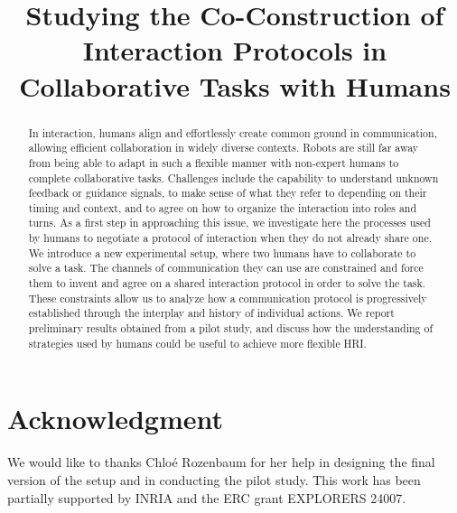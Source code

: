 \documentclass[conference]{IEEEtran}
\begin{document}
\title{Studying the Co-Construction of Interaction Protocols in Collaborative Tasks with Humans}

\author{
}

\maketitle

\begin{abstract}
In interaction, humans align and effortlessly create common ground in communication, allowing efficient collaboration in widely diverse contexts.
Robots are still far away from being able to adapt in such a flexible manner with non-expert humans to complete collaborative tasks. Challenges include the capability to understand unknown feedback or guidance signals, to make sense of what they refer to depending on their timing and context, and to agree on how to organize the interaction into roles and turns. 
As a first step in approaching this issue, we investigate here the processes used by humans to negotiate a protocol of interaction when they do not already share one.
We introduce a new experimental setup, where two humans have to collaborate to solve a task. The channels of communication they can use are constrained and force them to invent and agree on a shared interaction protocol in order to solve the task. These constraints allow us to analyze how a communication protocol is progressively established through the interplay and history of individual actions. We report preliminary results obtained from a pilot study, and discuss how the understanding of strategies used by humans could be useful to achieve more flexible HRI.
\end{abstract}

\IEEEpeerreviewmaketitle





%


\section*{Acknowledgment}

We would like to thanks Chlo\'e Rozenbaum for her help in designing the final version of the setup and in conducting the pilot study. This work has been partially supported by INRIA and the ERC grant EXPLORERS 24007.



\end{document}
